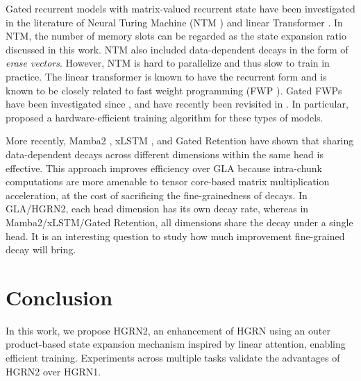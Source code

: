 Gated recurrent models with matrix-valued recurrent state have been investigated in the literature of Neural Turing Machine (NTM \citealt{Graves2014NeuralTM}) and linear Transformer \citep{katharopoulos2020transformers}. In NTM, the number of memory slots can be regarded as the state expansion ratio discussed in this work. NTM also included data-dependent decays in the form of \emph{erase vectors}. However, NTM is hard to parallelize and thus slow to train in practice. The linear transformer is known to have the recurrent form \citep{katharopoulos2020transformers} and is known to be closely related to fast weight programming (FWP \citealt{linear-xmr-fastweight}). Gated FWPs have been investigated since \cite{Schlag2017GatedFW, Zhang2017LearningTU}, and have recently been revisited in \cite{peng2021random, mao-2022-fine, GLA, gatedloop, recurrent_linear_xfmr}. In particular, \cite{GLA} proposed a hardware-efficient training algorithm for these types of models.

More recently, Mamba2 \citep{Dao2024TransformersAS}, xLSTM \citep{Beck2024xLSTMEL}, and Gated Retention \citep{Sun2024YouOC} have shown that sharing data-dependent decays across different dimensions within the same head is effective. This approach improves efficiency over GLA because intra-chunk computations are more amenable to tensor core-based matrix multiplication acceleration, at the cost of sacrificing the fine-grainedness of decays. In GLA/HGRN2, each head dimension has its own decay rate, whereas in Mamba2/xLSTM/Gated Retention, all dimensions share the decay under a single head. It is an interesting question to study how much improvement fine-grained decay will bring.

\section{Conclusion}
In this work, we propose HGRN2, an enhancement of HGRN \citep{HGRN} using an outer product-based state expansion mechanism inspired by linear attention, enabling efficient training. Experiments across multiple tasks validate the advantages of HGRN2 over HGRN1.


